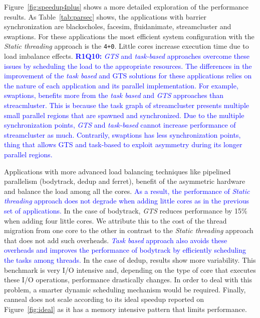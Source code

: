 Figure~\ref{fig:speedup4plus} shows a more detailed exploration of the performance results. 
As Table~\ref{tab:parsec} shows, the applications with barrier synchronization are blackscholes, facesim, fluidanimate, streamcluster and swaptions. 
For these applications the most efficient system configuration with the \emph{Static threading} approach is the \texttt{4+0}. 
Little cores increase execution time due to load imbalance effects. 
\textcolor{blue}{
	\textbf{R1Q10:} \emph{GTS} and \emph{task-based} approaches overcome these issues by scheduling the load to the appropriate resources. 
	The differences in the improvement of the \emph{task based} and GTS solutions for these applications relies on the nature of each application and its parallel implementation.
	For example, swaptions, benefits more from the \emph{task based} and \emph{GTS} approaches than streacmluster.  
	This is because the task graph of streamcluster presents multiple small parallel regions that are spawned and synchronized. 
	Due to the multiple synchronization points, \emph{GTS} and \emph{task-based} cannot increase performance of streamcluster as much. 
	Contrarily, swaptions has less synchronization points, thing that allows GTS and task-based to exploit asymmetry during its longer parallel regions.
}



Applications with more advanced load balancing techniques like pipelined parallelism (bodytrack, dedup and ferret), benefit of the asymmetric hardware and balance the load among all the cores. 
\textcolor{blue}{As a result, the performance of \emph{Static threading} approach does not degrade when adding little cores as in the previous set of applications.
}
In the case of bodytrack, \emph{GTS} reduces performance by 15\% when 
adding four little cores. 
We attribute this to the cost of the thread migration from one core to the 
other in contrast to the \emph{Static threading} approach that does not add such overheads.
\textcolor{blue}{
\emph{Task based} approach also avoids these overheads and improves the performance of bodytrack by efficiently scheduling the tasks among threads.
}
In the case of dedup, results show more variability. This benchmark is very I/O intensive and, depending on the type of core that executes these I/O operations, performance drastically changes. In order to deal with this problem, a smarter dynamic scheduling mechanism would be required. 
Finally, canneal does not scale according to its ideal speedup reported on Figure~\ref{fig:ideal} as it has a memory intensive pattern that limits performance.

